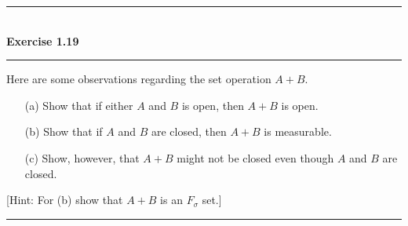 \documentclass[a4paper,11pt]{article}
\begin{document}

\begin{flushleft}
	\rule[-0.5ex]{17cm}{2pt}\\
		\textbf{Exercise 1.19}\\
	\rule[1.5ex]{17cm}{0.5pt}
		Here are some observations regarding the set operation $A + B$.
		\begin{enumerate}
			\item [(a)] Show that if either $A$ and $B$ is open, then $A + B$ is open.

			\item [(b)] Show that if $A$ and $B$ are closed, then $A + B$ is measurable.

			\item [(c)] Show, however, that $A + B$ might not be closed even though $A$ and $B$ are closed.
		\end{enumerate}
		[Hint: For (b) show that $A + B$ is an $F_\sigma$ set.]
	\rule[1.0ex]{17cm}{0.5pt}\
\end{flushleft}
\end{document}
